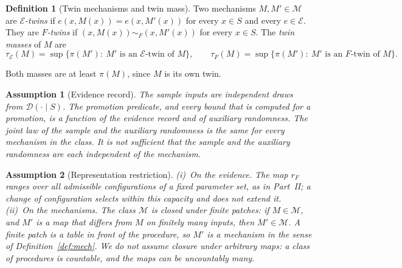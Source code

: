 \documentclass[11pt]{article}
\newtheorem{assumption}{Assumption}
\theoremstyle{definition}
\newtheorem{definition}{Definition}
\theoremstyle{remark}
\newcommand{\simF}{\sim_F}
\newcommand{\D}{\mathcal{D}}
\newcommand{\Mclass}{\mathcal{M}}
\begin{document}
\begin{definition}[Twin mechanisms and twin mass]\label{def:twin}
Two mechanisms $M,M'\in\Mclass$ are \emph{$\mathcal{E}$-twins} if $e(x,M(x))=e(x,M'(x))$ for every
$x\in S$ and every $e\in\mathcal{E}$. They are \emph{$F$-twins} if $(x,M(x))\simF(x,M'(x))$ for every
$x\in S$. The \emph{twin masses} of $M$ are
\[
\tau_{\mathcal{E}}(M)=\sup\{\pi(M'):\ M'\text{ is an $\mathcal{E}$-twin of }M\},\qquad
\tau_F(M)=\sup\{\pi(M'):\ M'\text{ is an $F$-twin of }M\}.
\]
\end{definition}
Both masses are at least $\pi(M)$, since $M$ is its own twin.

\begin{assumption}[Evidence record]\label{ass:pred}
The sample inputs are independent draws from $\D(\cdot\mid S)$. The promotion predicate, and every
bound that is computed for a promotion, is a function of the evidence record and of auxiliary
randomness. The joint law of the sample and the auxiliary randomness is the same for every mechanism
in the class. It is not sufficient that the sample and the auxiliary randomness are each independent
of the mechanism.
\end{assumption}

\begin{assumption}[Representation restriction]\label{ass:rep}
(i)~\emph{On the evidence.} The map $r_F$ ranges over all admissible configurations of a fixed
parameter set, as in Part~II; a change of configuration selects within this capacity and does not extend it.
(ii)~\emph{On the mechanisms.} The class $\Mclass$ is closed under finite patches: if $M\in\Mclass$,
and $M'$ is a map that differs from $M$ on finitely many inputs, then $M'\in\Mclass$. A finite
patch is a table in front of the procedure, so $M'$ is a mechanism in the sense of
Definition~\ref{def:mech}. We do not assume closure under arbitrary maps: a class of procedures is
countable, and the maps can be uncountably many.
\end{assumption}
\end{document}
